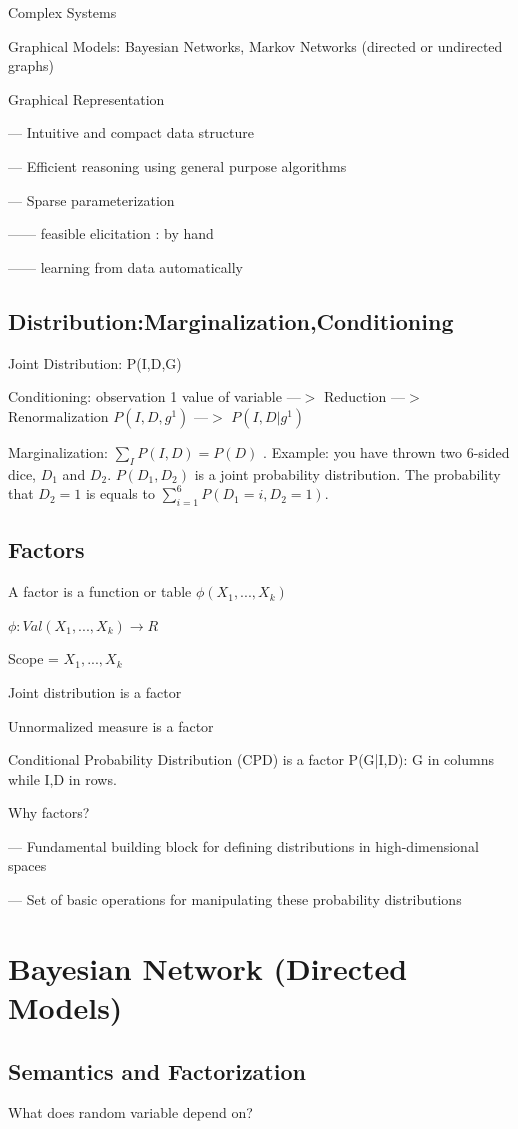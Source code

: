 \documentclass{book}
\begin{document}
Complex Systems

Graphical Models: Bayesian Networks, Markov Networks (directed or undirected graphs)

Graphical Representation

--- Intuitive and compact data structure

--- Efficient reasoning using general purpose algorithms

--- Sparse parameterization

------ feasible elicitation : by hand

------ learning from data automatically

\subsection{Distribution:Marginalization,Conditioning }
Joint Distribution: P(I,D,G)

Conditioning: observation 1 value of variable ---$>$ Reduction ---$>$ Renormalization $P(I,D,g^1)$  ---$>$ $P(I,D|g^1)$


Marginalization: $\sum_{I}P(I,D) = P(D)$ . Example: you have thrown two 6-sided dice, $D_1$ and $D_2$. $P(D_1,D_2)$ is a joint probability distribution. The probability that $D_2=1$ is equals to $\sum_{i=1}^{6}P(D_1 = i, D_2=1)$.

\subsection{Factors}
A factor is a function or table $\phi(X_1,...,X_k)$

$\phi: Val(X_1,...,X_k) \rightarrow R$

Scope = ${X_1,...,X_k}$

Joint distribution is a factor

Unnormalized measure is a factor

Conditional Probability Distribution (CPD) is a factor P(G|I,D): G in columns while I,D in rows.

Why factors?

--- Fundamental building block for defining distributions in high-dimensional spaces

--- Set of basic operations for manipulating these probability distributions

\section{Bayesian Network (Directed Models)}
\subsection{Semantics and Factorization}
What does random variable depend on?
\end{document}
